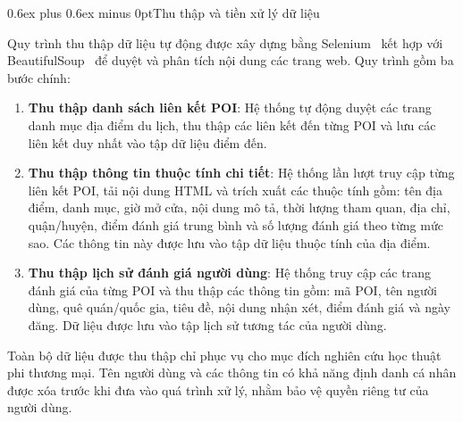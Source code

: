 \documentclass[journal,onecolumn,10pt]{IEEEtran}
\makeatletter
\def\subsection{\@startsection{subsection}{2}{\z@}{1.8ex plus 1.0ex minus 0.3ex}%
{0.6ex plus 0.6ex minus 0pt}{\normalfont\normalsize\bfseries}}
\makeatother
\begin{document}

\subsection{Thu thập và tiền xử lý dữ liệu}

Quy trình thu thập dữ liệu tự động được xây dựng bằng Selenium~\cite{r26, r27} kết hợp với BeautifulSoup~\cite{r28, r29, r30} để duyệt và phân tích nội dung các trang web. Quy trình gồm ba bước chính:
\begin{enumerate}
    \item \textbf{Thu thập danh sách liên kết POI}: Hệ thống tự động duyệt các trang danh mục địa điểm du lịch, thu thập các liên kết đến từng POI và lưu các liên kết duy nhất vào tập dữ liệu điểm đến.
    
    \item \textbf{Thu thập thông tin thuộc tính chi tiết}: Hệ thống lần lượt truy cập từng liên kết POI, tải nội dung HTML và trích xuất các thuộc tính gồm: tên địa điểm, danh mục, giờ mở cửa, nội dung mô tả, thời lượng tham quan, địa chỉ, quận/huyện, điểm đánh giá trung bình và số lượng đánh giá theo từng mức sao. Các thông tin này được lưu vào tập dữ liệu thuộc tính của địa điểm.
    
    \item \textbf{Thu thập lịch sử đánh giá người dùng}: Hệ thống truy cập các trang đánh giá của từng POI và thu thập các thông tin gồm: mã POI, tên người dùng, quê quán/quốc gia, tiêu đề, nội dung nhận xét, điểm đánh giá và ngày đăng. Dữ liệu được lưu vào tập lịch sử tương tác của người dùng.
\end{enumerate}

Toàn bộ dữ liệu được thu thập chỉ phục vụ cho mục đích nghiên cứu học thuật phi thương mại. Tên người dùng và các thông tin có khả năng định danh cá nhân được xóa trước khi đưa vào quá trình xử lý, nhằm bảo vệ quyền riêng tư của người dùng.
\end{document}

